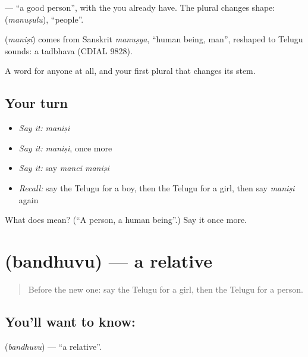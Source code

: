 \textbf{ } — \textquotedblleft{}a good person\textquotedblright{}, with the \textbf{} you already have. The plural changes shape: \textbf{} (\emph{manuṣulu}), \textquotedblleft{}people\textquotedblright{}.

\begin{cousinweb}
\textbf{} (\emph{maniṣi}) comes from Sanskrit \emph{manuṣya}, \textquotedblleft{}human being, man\textquotedblright{}, reshaped to Telugu sounds: a tadbhava (CDIAL 9828).
\end{cousinweb}

\begin{grammarlens}[title={What you've built}]
A word for anyone at all, and your first plural that changes its stem.
\end{grammarlens}

\subsection*{Your turn}
\begin{itemize}
\raggedright
  \item \emph{Say it:} \emph{maniṣi}
  \item \emph{Say it:} \emph{maniṣi}, once more
  \item \emph{Say it:} say \emph{manci maniṣi}
  \item \emph{Recall:} say the Telugu for a boy, then the Telugu for a girl, then say \emph{maniṣi} again
\end{itemize}

\begin{tcolorbox}[breakable,colback=teal!4,colframe=teal!35!black,title={Before you move on}]
What does  mean? (\textquotedblleft{}A person, a human being\textquotedblright{}.) Say it once more.
\end{tcolorbox}
\section[\texorpdfstring{\te{బంధువు} (bandhuvu)}{బంధువు (bandhuvu)}]{ (bandhuvu) — a relative}

\label{lesson:TE-C88-relative}



\begin{quote}
Before the new one: say the Telugu for a girl, then the Telugu for a person.
\end{quote}

\subsection*{You'll want to know: }
\textbf{} (\emph{bandhuvu}) — \textquotedblleft{}a relative\textquotedblright{}.


